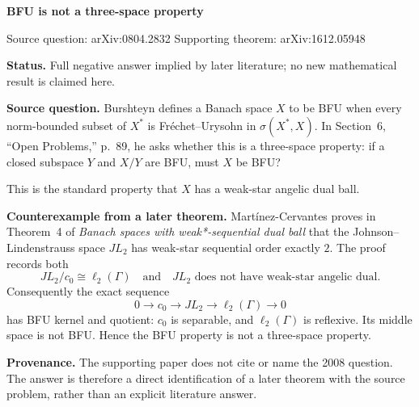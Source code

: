 \documentclass[11pt]{article}
\begin{document}
\begin{center}
{\Large\bfseries BFU is not a three-space property}\par
\vspace{0.4em}
{\small Source question: arXiv:0804.2832 \qquad Supporting theorem: arXiv:1612.05948}
\end{center}

\textbf{Status.} Full negative answer implied by later literature; no new
mathematical result is claimed here.

\textbf{Source question.} Burshteyn defines a Banach space $X$ to be BFU
when every norm-bounded subset of $X^*$ is Fréchet--Urysohn in
$\sigma(X^*,X)$.  In Section~6, ``Open Problems,'' p.~89, he asks whether
this is a three-space property: if a closed subspace $Y$ and $X/Y$ are BFU,
must $X$ be BFU?

This is the standard property that $X$ has a weak-star angelic dual ball.

\textbf{Counterexample from a later theorem.} Martínez-Cervantes proves in
Theorem~4 of \emph{Banach spaces with weak*-sequential dual ball} that the
Johnson--Lindenstrauss space $JL_2$ has weak-star sequential order exactly
$2$.  The proof records both
\[
 JL_2/c_0\cong \ell_2(\Gamma)
 \quad\text{and}\quad
 JL_2\text{ does not have weak-star angelic dual}.
\]
Consequently the exact sequence
\[
 0\longrightarrow c_0\longrightarrow JL_2
   \longrightarrow \ell_2(\Gamma)\longrightarrow 0
\]
has BFU kernel and quotient: $c_0$ is separable, and $\ell_2(\Gamma)$ is
reflexive.  Its middle space is not BFU.  Hence the BFU property is not a
three-space property.

\textbf{Provenance.} The supporting paper does not cite or name the 2008
question.  The answer is therefore a direct identification of a later
theorem with the source problem, rather than an explicit literature answer.
\end{document}
